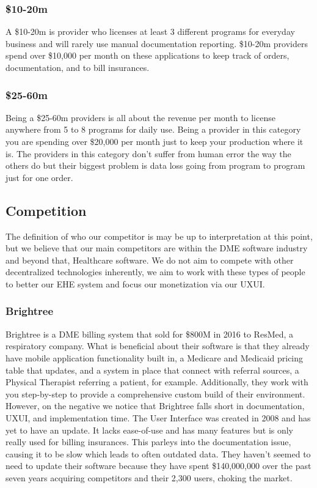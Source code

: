 \documentclass[letterpaper]{article}
\begin{document}
  \subsubsection{\$10-20m}
  A \$10-20m is provider who licenses at least 3 different programs for everyday business and will rarely use manual documentation reporting. \$10-20m providers spend over \$10,000 per month on these applications to keep track of orders, documentation, and to bill insurances.
%
  \subsubsection{\$25-60m}
  Being a \$25-60m providers is all about the revenue per month to license anywhere from 5 to 8 programs for daily use. Being a provider in this category you are spending over \$20,000 per month just to keep your production where it is. The providers in this category don’t suffer from human error the way the others do but their biggest problem is data loss going from program to program just for one order.
%
\subsection{Competition}
The definition of who our competitor is may be up to interpretation at this point, but we believe that our main competitors are within the DME software industry and beyond that, Healthcare software. We do not aim to compete with other decentralized technologies inherently, we aim to work with these types of people to better our EHE system and focus our monetization via our UXUI.
%
  \subsubsection{Brightree}
  Brightree is a DME billing system that sold for \$800M in 2016 to ResMed, a respiratory company. What is beneficial about their software is that they already have mobile application functionality built in, a Medicare and Medicaid pricing table that updates, and a system in place that connect with referral sources, a Physical Therapist referring a patient, for example. Additionally, they work with you step-by-step to provide a comprehensive custom build of their environment.
%
  However, on the negative we notice that Brightree falls short in documentation, UXUI, and implementation time. The User Interface was created in 2008 and has yet to have an update. It lacks ease-of-use and has many features but is only really used for billing insurances. This parleys into the documentation issue, causing it to be slow which leads to often outdated data. They haven’t seemed to need to update their software because they have spent \$140,000,000 over the past seven years acquiring competitors and their 2,300 users, choking the market.
%
\end{document}
